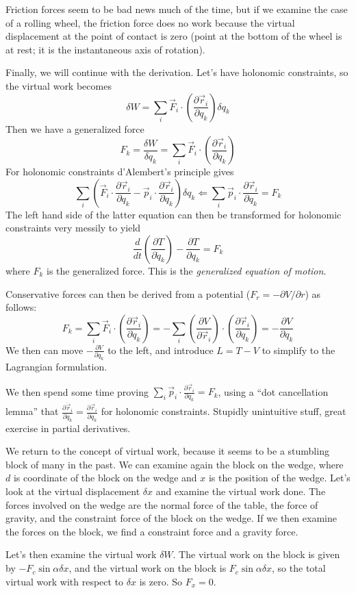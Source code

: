 \documentclass[10pt]{report}
\newcommand{\rd}[2]{\frac{d#1}{d#2}}
\newcommand{\pd}[2]{\frac{\partial #1}{\partial#2}}
\begin{document}
Friction forces seem to be bad news much of the time, but if we examine the case of a rolling wheel, the friction force does no work because the virtual displacement at the point of contact is zero (point at the bottom of the wheel is at rest; it is the instantaneous axis of rotation). 

Finally, we will continue with the derivation. Let's have holonomic constraints, so the virtual work becomes
$$\delta W = \sum_i \vec{F}_i \cdot \left( \pd{\vec{r}_i}{q_k} \right)\delta q_k$$
Then we have a generalized force
$$ F_k = \frac{\delta W}{\delta q_k} = \sum_i \vec{F}_i \cdot \left( \pd{\vec{r}_i}{q_k} \right)$$
For holonomic constraints d'Alembert's principle gives
$$\sum_i \left( \vec{F}_i\cdot \pd{\vec{r}_i}{q_k}-\vec{p}_i\cdot \pd{\vec{r}_i}{q_k} \right)\delta q_k \Leftarrow \sum_i \vec{p}_i \cdot \pd{\vec{r}_i}{q_k} = F_k$$
The left hand side of the latter equation can then be transformed for holonomic constraints very messily to yield
$$\rd{}{t}\left( \pd{T}{\dot{q}_k} \right) - \pd{T}{q_k} = F_k$$
where $F_k$ is the generalized force. This is the \emph{generalized equation of motion}.

Conservative forces can then be derived from a potential ($F_r = -\partial V/\partial r$) as follows:
$$F_k = \sum_i \vec{F}_i \cdot \left( \pd{\vec{r}_i}{q_k} \right) = -\sum_i \left( \pd{V}{\vec{r}_i} \right) \cdot \left( \pd{\vec{r}_i}{q_k} \right) = -\pd{V}{q_k}$$
We then can move $-\pd{V}{q_k}$ to the left, and introduce $L=T-V$ to simplify to the Lagrangian formulation. 

We then spend some time proving $\sum_i \vec{p}_i \cdot \pd{\vec{r}_i}{q_k} = F_k$, using a ``dot cancellation lemma'' that $\pd{\dot{\vec{r}}_i}{\dot{q}_k} = \pd{\vec{r}_i}{q_k}$ for holonomic constraints. Stupidly unintuitive stuff, great exercise in partial derivatives.

We return to the concept of virtual work, because it seems to be a stumbling block of many in the past. We can examine again the block on the wedge, where $d$ is coordinate of the block on the wedge and $x$ is the position of the wedge. Let's look at the virtual displacement $\delta x$ and examine the virtual work done. The forces involved on the wedge are the normal force of the table, the force of gravity, and the constraint force of the block on the wedge. If we then examine the forces on the block, we find a constraint force and a gravity force.

Let's then examine the virtual work $\delta W$. The virtual work on the block is given by $-F_c\sin \alpha\delta x$, and the virtual work on the block is $F_c\sin\alpha \delta x$, so the total virtual work with respect to $\delta x$ is zero. So $F_x = 0$.
\end{document}
